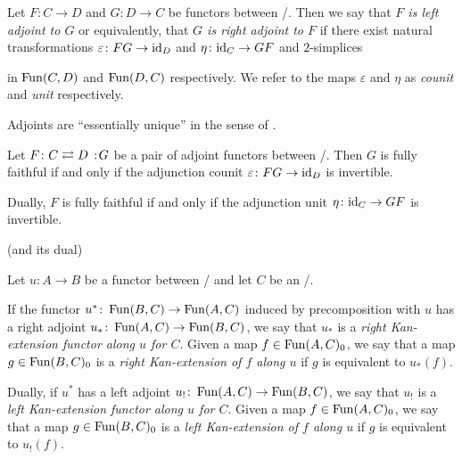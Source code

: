 \begin{definition}[Adjoints]
    Let $F\colon C\to D$ and $G\colon D\to C$ be functors between \inftycats/.
    Then we say that \emph{$F$ is left adjoint to $G$} or equivalently, that \emph{$G$ is right adjoint to $F$}
    if there exist natural transformations $\varepsilon\colon FG\to \text{id}_D$ and $\eta\colon\text{id}_C\to GF$ and $2$-simplices 
    \begin{center}
    \end{center}
    in $\operatorname{Fun}(C,D)$ and $\operatorname{Fun}(D,C)$ respectively.
    We refer to the maps $\varepsilon$ and $\eta$ as \emph{counit} and \emph{unit} respectively.
\end{definition}
\begin{remark}
    Adjoints are ``essentially unique'' in the sense of \cite[Proposition 6.1.9]{cisinski_2019}.
\end{remark}
\begin{corollary}\label{cor:CoUnitInvertibleFF}
    Let $F\colon C\rightleftarrows D\mkern+3mu:\mkern-3mu G$ be a pair of adjoint functors between \inftycats/.
    Then $G$ is fully faithful if and only if the adjunction counit $\varepsilon\colon FG\to \text{id}_D$ is invertible.

    Dually, $F$ is fully faithful if and only if the adjunction unit $\eta\colon\text{id}_C\to GF$ is invertible.
    \begin{reference}
        \cite[Corollary 6.2.2.13]{kerodon} (and its dual)
    \end{reference}
\end{corollary}
\begin{definition}
    Let $u\colon A\to B$ be a functor between \inftycats/ and let $C$ be an \inftycat/.
    
    If the functor $u^*\colon\operatorname{Fun}(B,C)\to\operatorname{Fun}(A,C)$ induced by precomposition with $u$ has a right adjoint $u_*\colon\operatorname{Fun}(A,C)\to\operatorname{Fun}(B,C)$, we say that $u_*$ is a \emph{right Kan-extension functor along $u$ for $C$}.
    Given a map $f\in\operatorname{Fun}(A,C)_0$, we say that a map $g\in\operatorname{Fun}(B,C)_0$ is a \emph{right Kan-extension of $f$ along $u$} if $g$ is equivalent to $u_*(f)$.

    Dually, if $u^*$ has a left adjoint $u_!\colon\operatorname{Fun}(A,C)\to\operatorname{Fun}(B,C)$, we say that $u_!$ is a \emph{left Kan-extension functor along $u$ for $C$}.
    Given a map $f\in\operatorname{Fun}(A,C)_0$, we say that a map $g\in\operatorname{Fun}(B,C)_0$ is a \emph{left Kan-extension of $f$ along $u$} if $g$ is equivalent to $u_!(f)$.
\end{definition}

